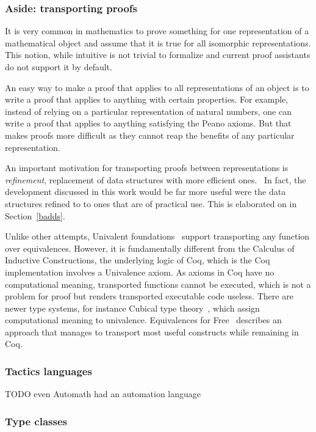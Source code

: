\documentclass[english, 12pt, a4paper, sci, a-1b, online]{aaltothesis}
\begin{document}
\subsubsection{Aside: transporting proofs}\label{transport}

It is very common in mathematics to prove something for one representation of a mathematical object and assume that it is true for all isomorphic representations. This notion, while intuitive is not trivial to formalize and current proof assistants do not support it by default.

An easy way to make a proof that applies to all representations of an object is to write a proof that applies to anything with certain properties. For example, instead of relying on a particular representation of natural numbers, one can write a proof that applies to anything satisfying the Peano axioms. But that makes proofs more difficult as they cannot reap the benefits of any particular representation.~\cite{transferAlongIso}

An important motivation for transporting proofs between representations is \emph{refinement}, replacement of data structures with more efficient ones.~\cite{refinementsFF} In fact, the development discussed in this work would be far more useful were the data structures refined to to ones that are of practical use. This is elaborated on in Section~\ref{badds}.

Unlike other attempts, Univalent foundations~\cite{hottbook} support transporting any function over equivalences. However, it is fundamentally different from the Calculus of Inductive Constructions, the underlying logic of Coq, which is the Coq implementation involves a Univalence axiom. As axioms in Coq have no computational meaning, transported functions cannot be executed, which is not a problem for proof but renders transported executable code useless. There are newer type systems, for instance Cubical type theory~\cite{cubicalTT}, which assign computational meaning to univalence. Equivalences for Free~\cite{equivalencesFF} describes an approach that manages to transport most useful constructs while remaining in Coq.

\subsubsection{Tactics languages}

TODO even Automath had an automation language

\subsubsection{Type classes}
\end{document}
